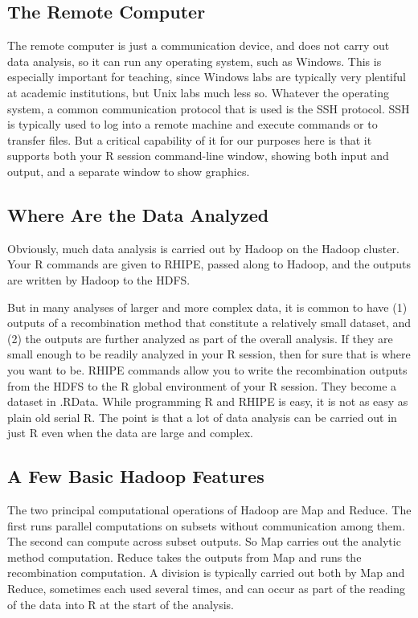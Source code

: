 \subsection{The Remote Computer}

The remote computer is just a communication device, and does not carry out data
analysis, so it can run any operating system, such as Windows. This is
especially important for teaching, since Windows labs are typically very
plentiful at academic institutions, but Unix labs much less so.
Whatever the operating system, a common communication protocol that  is used
is the SSH protocol. SSH is typically used to log into a remote machine and
execute commands or to transfer files. But a critical capability of it for our
purposes here is that it supports both your R session command-line window,
showing both input and output, and a separate window to show graphics.

\subsection{Where Are the Data Analyzed}

Obviously, much data analysis is carried out by Hadoop on the Hadoop cluster.
Your R commands are given to RHIPE, passed along to Hadoop, and the outputs
are written by Hadoop to the HDFS.

But in many analyses of larger and more complex data, it is common to have
(1) outputs of a recombination method that constitute a relatively small
dataset, and (2) the outputs are further analyzed as part of the overall
analysis. If they are small enough to be readily analyzed in your R session,
then for sure that is where you want to be.
RHIPE commands allow you to write the recombination outputs from the HDFS to
the R global environment of your R session. They become a dataset in .RData.
While programming R and RHIPE is easy, it is not as easy as plain old serial R.
The point is that a lot of data analysis can be carried out in just R even when
the data are large and complex.

\subsection{A Few Basic Hadoop Features}

The two principal computational operations of Hadoop are Map and Reduce. The
first runs parallel computations on subsets without communication among them.
The second can compute across subset outputs. So Map carries out the
analytic method computation. Reduce takes the outputs from Map
and runs the recombination computation.
A division is typically carried out both by Map and Reduce, sometimes each used
several times,  and can occur as
part of the reading of the data into R at the start of the analysis.

